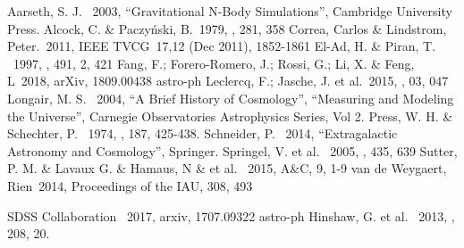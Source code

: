 \documentclass[preprint]{aastex62}
\begin{document}
  \begin{thebibliography}{}

     Aarseth, S. J. \ 2003, ``Gravitational N-Body Simulations'', Cambridge University Press.
     Alcock, C. \& Paczy\'nski, B.\ 1979, \nat, 281, 358    
     Correa, Carlos \& Lindstrom, Peter.\ 2011,  IEEE TVCG\ 17,12 (Dec 2011), 1852-1861
     El-Ad, H. \& Piran, T. \ 1997, \apj, 491, 2, 421
     Fang, F.; Forero-Romero, J.; Rossi, G.; Li, X. \& Feng, L\ 2018, arXiv, 1809.00438 astro-ph
     Leclercq, F.; Jasche, J. et al.\ 2015, \jcap, 03, 047
     Longair, M. S. \ 2004, ``A Brief History of Cosmology'', ``Measuring and Modeling the Universe'', Carnegie Observatories Astrophysics Series, Vol 2.
     Press, W. H. \& Schechter, P. \ 1974, \apj, 187, 425-438.
     Schneider, P. \ 2014, ``Extragalactic Astronomy and Cosmology'', Springer.
     Springel, V. et al. \ 2005, \nat, 435, 639
     Sutter, P. M. \& Lavaux G. \& Hamaus, N \& et al. \ 2015, A\&C, 9, 1-9
     van de Weygaert, Rien\ 2014, Proceedings of the IAU, 308, 493   

      
     SDSS Collaboration \ 2017, arxiv, 1707.09322 astro-ph
     Hinshaw, G. et al. \ 2013, \apjs, 208, 20.
  \end{thebibliography}                                                           
                       

\end{document}
